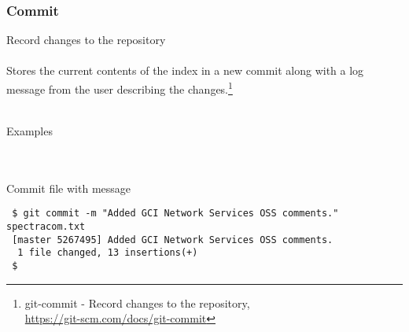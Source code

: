 
\subsubsection{Commit}
Record changes to the repository
\\
\\
Stores the current contents of the index in a new commit along with
a log message from the user describing the changes.\footnote{git-commit - Record changes to the repository,\\
\href{https://git-scm.com/docs/git-commit}{https://git-scm.com/docs/git-commit}}
\\
\\

\noindent \begin{bf}Examples\end{bf}
\\
\\
\noindent Commit  file with message
\begin{Verbatim}
 $ git commit -m "Added GCI Network Services OSS comments." spectracom.txt
 [master 5267495] Added GCI Network Services OSS comments.
  1 file changed, 13 insertions(+)
 $ 
\end{Verbatim}
